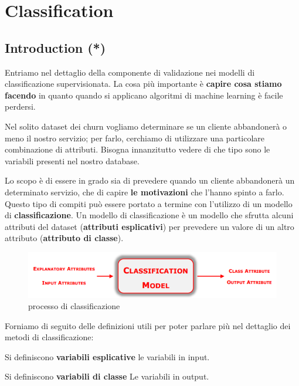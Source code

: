 \section{Classification}

\subsection{Introduction (*)}
Entriamo nel dettaglio della componente di validazione nei modelli di classificazione supervisionata.
La cosa più importante è \textbf{capire cosa stiamo facendo} in quanto quando si applicano algoritmi di machine learning è facile perdersi.

Nel solito dataset dei churn vogliamo determinare se un cliente abbandonerà o meno il nostro servizio; per farlo, cerchiamo di utilizzare una particolare combinazione di attributi. Bisogna innanzitutto vedere di che tipo sono le variabili presenti nel nostro database.

Lo scopo è di essere  in grado sia di prevedere quando un cliente abbandonerà un determinato servizio, che di capire \textbf{le motivazioni} che l'hanno spinto a farlo. Questo tipo di compiti può essere portato a termine con l'utilizzo di un modello di \textbf{classificazione}. Un modello di classificazione è un modello che sfrutta alcuni attributi del dataset (\textbf{attributi esplicativi}) per prevedere un valore di un altro attributo (\textbf{attributo di classe}).

\begin{figure}[H]
	\centering
	\includegraphics[width= \linewidth]{classification/pict/class_model.png}
	\caption{processo di classificazione}
\end{figure}

Forniamo di seguito delle definizioni utili per poter parlare più nel dettaglio dei metodi di classificazione:
\begin{defn}
	Si definiscono \textbf{variabili esplicative} le variabili in input.
\end{defn}

\begin{defn}
	Si definiscono \textbf{variabili di classe}	Le variabili in output.
\end{defn}

